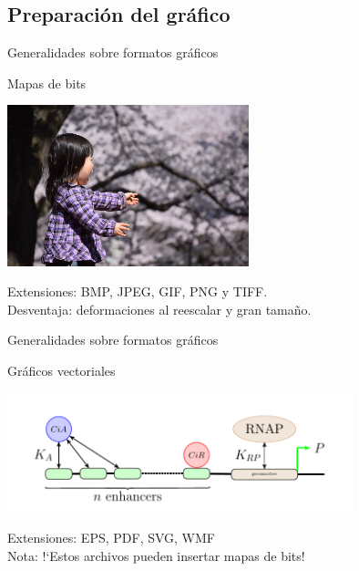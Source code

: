\documentclass[10pt]{beamer}
\begin{document}
\subsection{Preparación del gráfico}
\begin{frame}{Generalidades sobre formatos gr\'aficos}
\begin{block}{Mapas de bits} 
\begin{center}
\includegraphics[width=7cm]{./graficos/sorpresa.jpg}
\end{center}
Extensiones: BMP, JPEG, GIF, PNG y TIFF. \\
{\small Desventaja: deformaciones al reescalar y gran tama\~no.}
\end{block}
\end{frame}
\begin{frame}{Generalidades sobre formatos gr\'aficos}
\begin{block} {Gr\'aficos vectoriales} 
\begin{center}
\includegraphics[width=10cm]{./graficos/bp2.pdf}
\end{center}
Extensiones: EPS, PDF, SVG, WMF \\
{\small Nota: !`Estos archivos pueden insertar mapas de bits! }
\end{block}
\end{frame}
\end{document}
